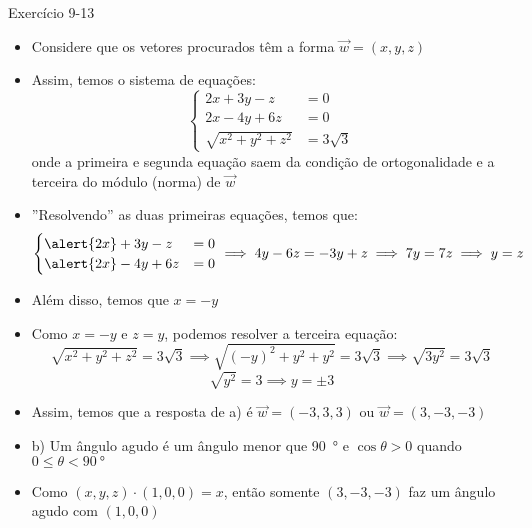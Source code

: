 \begin{frame}{Exercício 9-13}
    \begin{itemize}
        \item Considere que os vetores procurados têm a forma \(\vec{w}=(x,y,z)\)
        \item Assim, temos o sistema de equações:
            \[
                \begin{cases}
                    2x+3y-z&=0 \\ 2x-4y+6z&=0 \\ \sqrt{x^2+y^2+z^2}&=3\sqrt{3}
                \end{cases}
            \]
            onde a primeira e segunda equação saem da condição de ortogonalidade e a terceira do módulo (norma) de \(\vec{w}\)
        \item ''Resolvendo'' as duas primeiras equações, temos que:
            \[
                \begin{cases}
                    \alert{2x}+3y-z&=0 \\ \alert{2x}-4y+6z&=0
                \end{cases}
                \implies 4y-6z=-3y+z \implies 7y=7z \implies y=z
            \]
        \item Além disso, temos que \(x=-y\)
    \end{itemize}

\end{frame}

\begin{frame}{}
    \begin{itemize}
        \item Como \(x=-y\) e \(z=y\), podemos resolver a terceira equação:
            \[
                \sqrt{x^2+y^2+z^2}=3\sqrt{3} \implies
                \sqrt{(-y)^2+y^2+y^2}=3\sqrt{3} \implies
                \sqrt{3y^2}=3\sqrt{3}
            \]
            \[
                \sqrt{y^2}=3 \implies y=\pm 3
            \]
        \item Assim, temos que a resposta de \alert{a)} é \(\vec{w}=(-3,3,3)\) ou \(\vec{w}=(3,-3,-3)\)
        \item b) Um ângulo agudo é um ângulo menor que \SI{90}{\degree} e \(\cos{\theta} > 0\) quando \( 0 \leq \theta < \SI{90}{\degree}\)
        \item Como \((x,y,z) \cdot (1,0,0)=x\), então somente \((3,-3,-3)\) faz um ângulo agudo com \((1,0,0)\)
    \end{itemize}
\end{frame}

